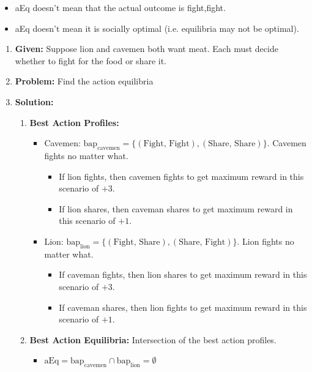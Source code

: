 \begin{warning}
    \begin{itemize}
        \item aEq doesn't mean that the actual outcome is fight,fight. 
        \item aEq doesn't mean it is socially optimal (i.e. equilibria may not be optimal). 
    \end{itemize}
\end{warning}
\newpage

\begin{example}
    \begin{enumerate}
        \item \textbf{Given:} Suppose lion and cavemen both want meat. Each must decide whether to fight for the food or share it. 
        \item \textbf{Problem:} Find the action equilibria 
        \item \textbf{Solution:}
        \begin{enumerate}
            \item \textbf{Best Action Profiles:}
            \begin{itemize}
                \item Cavemen: $\text{bap}_{\text{cavemen}} = \{(\text{Fight, Fight}), (\text{Share, Share})\}$. Cavemen fights no matter what. 
                \begin{itemize}
                    \item If lion fights, then cavemen fights to get maximum reward in this scenario of $+3$. 
                    \item If lion shares, then caveman shares to get maximum reward in this scenario of $+1$.
                \end{itemize}
                \item Lion: $\text{bap}_{\text{lion}} = \{(\text{Fight, Share}), (\text{Share, Fight})\}$. Lion fights no matter what.
                \begin{itemize}
                    \item If caveman fights, then lion shares to get maximum reward in this scenario of $+3$.
                    \item If caveman shares, then lion fights to get maximum reward in this scenario of $+1$.
                \end{itemize}
            \end{itemize}
            \item \textbf{Best Action Equilibria:} Intersection of the best action profiles.
            \begin{itemize}
                \item $\text{aEq} = \text{bap}_{\text{cavemen}} \cap \text{bap}_{\text{lion}} = \emptyset$
            \end{itemize}
        \end{enumerate}
    \end{enumerate}
\end{example}
\newpage

